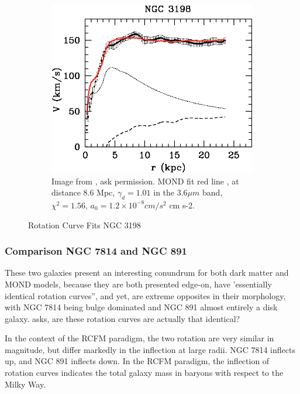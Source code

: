 \documentclass[reprint,%
 amsmath,amssymb,
 aps,
]{revtex4-1}
\begin{document}
\begin{figure}[h!]
\begin{subfigure}[c]{0.5\linewidth}
    \includegraphics[width=0.95\linewidth]{figures/NGC3198_TAM_aa15283-10-fig7.eps} 
    \caption{ Image from \citet{Blok1}, ask permission.
    MOND fit red line  , at distance $8.6$ Mpc,    $\gamma_d =  1.01$ in the $3.6 \mu m$ band, $\chi^2=1.56$, $a_0 = 1.2 \times 10^{-8} cm/ s^2$ cm s-2. } 
    \label{fig:NGC3198MOND} 
  \end{subfigure}%
  \caption{ Rotation Curve Fits   NGC 3198 }
  \label{fig1super} 
\end{figure}


    \subsubsection{Comparison NGC 7814 and NGC 891}
  
 These two galaxies present an interesting conundrum for both dark matter and MOND models, because they are both presented edge-on, have 'essentially identical rotation curves'', and yet,  are extreme opposites in their morphology,  with NGC 7814 being bulge dominated and NGC 891 almost entirely a disk galaxy. 
 \citet{Frat1} asks, are these rotation curves are actually that identical?
 
 
 
 In the context of the RCFM  paradigm, the two rotation are  very similar in magnitude,  but   differ markedly in the inflection  at large radii. 
 NGC 7814 inflects up, and  NGC 891 inflects down.
 In the RCFM paradigm, the inflection of rotation curves indicates   the total galaxy mass in baryons with respect to   the Milky Way.  
 
\end{document}
